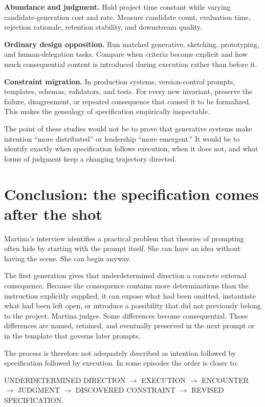 \documentclass[
  11pt,
  letterpaper,
]{article}
\begin{document}
\textbf{Abundance and judgment.} Hold project time constant while
varying candidate-generation cost and rate. Measure candidate count,
evaluation time, rejection rationale, retention stability, and
downstream quality.

\textbf{Ordinary design opposition.} Run matched generative, sketching,
prototyping, and human-delegation tasks. Compare when criteria become
explicit and how much consequential content is introduced during
execution rather than before it.

\textbf{Constraint migration.} In production systems, version-control
prompts, templates, schemas, validators, and tests. For every new
invariant, preserve the failure, disagreement, or repeated consequence
that caused it to be formalized. This makes the genealogy of
specification empirically inspectable.

The point of these studies would not be to prove that generative systems
make intention ``more distributed'' or leadership ``more emergent.'' It
would be to identify exactly when specification follows execution, when
it does not, and what forms of judgment keep a changing trajectory
directed.

\section{Conclusion: the specification comes after the
shot}\label{conclusion-the-specification-comes-after-the-shot}

Martina's interview identifies a practical problem that theories of
prompting often hide by starting with the prompt itself. She can have an
idea without having the scene. She can begin anyway.

The first generation gives that underdetermined direction a concrete
external consequence. Because the consequence contains more
determinations than the instruction explicitly supplied, it can expose
what had been omitted, instantiate what had been left open, or introduce
a possibility that did not previously belong to the project. Martina
judges. Some differences become consequential. Those differences are
named, retained, and eventually preserved in the next prompt or in the
template that governs later prompts.

The process is therefore not adequately described as intention followed
by specification followed by execution. In some episodes the order is
closer to:

\begin{center}
UNDERDETERMINED DIRECTION
$\rightarrow$ EXECUTION
$\rightarrow$ ENCOUNTER
$\rightarrow$ JUDGMENT
$\rightarrow$ DISCOVERED CONSTRAINT
$\rightarrow$ REVISED SPECIFICATION.
\end{center}
\end{document}
